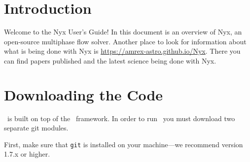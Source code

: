 
\section{Introduction}

Welcome to the Nyx User's Guide!  In this document is an overview of Nyx, an 
open-source multiphase flow solver. 
Another place to look for information about what is being done with Nyx is
{\url{https://amrex-astro.github.io/Nyx}}. There you can find papers published
and the latest science being done with Nyx.

\section{Downloading the Code}

\nyx\ is built on top of the \amrex\ framework.  In order to run
\nyx\, you must download two separate git modules.

\vspace{.1in}

\noindent First, make sure that {\tt git} is installed on your machine---we recommend version 1.7.x or higher.

\vspace{.1in}

